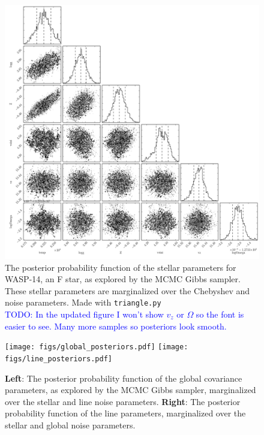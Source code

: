 \documentclass[preprint]{aastex} %
\newcommand{\todo}[1]{ \textcolor{Blue}{\\TODO: #1}}
\begin{document}
\begin{figure}[!htb]
\begin{minipage}{\textwidth}
\begin{center}
  \includegraphics[width=5in]{figs/stellar_triangle.png}
  \caption{The posterior probability function of the stellar parameters for WASP-14, an F star, as explored by the MCMC Gibbs sampler. These stellar parameters are marginalized over the Chebyshev and noise parameters. Made with \texttt{triangle.py}\protect\footnotemark
  \protect\todo{In the updated figure I won't show $v_z$ or $\Omega$ so the font is easier to see. Many more samples so posteriors look smooth.}
 }
\label{fig:stellar_posterior}
\end{center}
\end{minipage}
\end{figure}

\begin{figure}[!htb]
\begin{center}
  \texttt{[image: figs/global\_posteriors.pdf]}
  \texttt{[image: figs/line\_posteriors.pdf]}
  \caption{\textbf{Left}: The posterior probability function of the global covariance parameters, as explored by the MCMC Gibbs sampler, marginalized over the stellar and line noise parameters. \textbf{Right}: The posterior probability function of the line parameters, marginalized over the stellar and global noise parameters.}
\label{fig:noise_posterior}
\end{center}
\end{figure}
\end{document}
